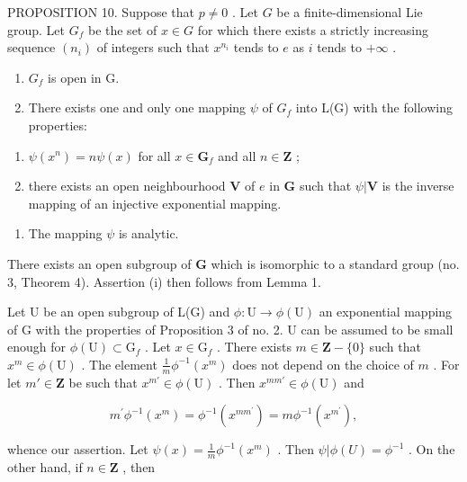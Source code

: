 PROPOSITION 10. Suppose that \(p \neq 0\) . Let \(G\) be a finite-dimensional Lie group. Let \(G_f\) be the set of \(x \in G\) for which there exists a strictly increasing sequence \((n_i)\) of integers such that \(x^{n_i}\) tends to \(e\) as \(i\) tends to \(+\infty\) .

\begin{enumerate}
\def\labelenumi{(\roman{enumi})}
\item
  \(G_{f}\) is open in G.
\item
  There exists one and only one mapping \(\psi\) of \(G_{f}\) into L(G) with the following properties:
\end{enumerate}

\begin{enumerate}
\def\labelenumi{(\alph{enumi})}
\item
  \(\psi (x^n) = n\psi (x)\) for all \(x\in \mathbf{G}_f\) and all \(n\in \mathbf{Z}\) ;
\item
  there exists an open neighbourhood \(\mathbf{V}\) of \(e\) in \(\mathbf{G}\) such that \(\psi |\mathbf{V}\) is the inverse mapping of an injective exponential mapping.
\end{enumerate}

\begin{enumerate}
\def\labelenumi{(\roman{enumi})}
\setcounter{enumi}{2}
\tightlist
\item
  The mapping \(\psi\) is analytic.
\end{enumerate}

There exists an open subgroup of \(\mathbf{G}\) which is isomorphic to a standard group (no. 3, Theorem 4). Assertion (i) then follows from Lemma 1.

Let U be an open subgroup of L(G) and \(\phi\colon\mathrm{U}\to\phi(\mathrm{U})\) an exponential mapping of G with the properties of Proposition 3 of no. 2. U can be assumed to be small enough for \(\phi(\mathrm{U})\subset\mathrm{G}_{f}\) . Let \(x\in\mathrm{G}_{f}\) . There exists \(m\in\mathbf{Z}-\{0\}\) such that \(x^{m}\in\phi(\mathrm{U})\) . The element \(\frac{1}{m}\phi^{-1}(x^{m})\) does not depend on the choice of \(m\) . For let \(m'\in\mathbf{Z}\) be such that \(x^{m'}\in\phi(\mathrm{U})\) . Then \(x^{mm'}\in\phi(\mathrm{U})\) and

\[
m ^ {\prime} \phi^ {- 1} (x ^ {m}) = \phi^ {- 1} (x ^ {m m ^ {\prime}}) = m \phi^ {- 1} (x ^ {m ^ {\prime}}),
\]

whence our assertion. Let \(\psi(x) = \frac{1}{m}\phi^{-1}(x^m)\) . Then \(\psi|\phi(U) = \phi^{-1}\) . On the other hand, if \(n \in \mathbf{Z}\) , then

